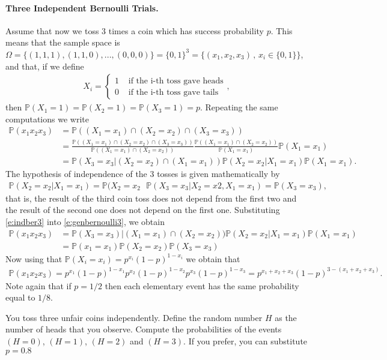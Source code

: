 \documentclass[12pt]{article}
\newcommand{\<}{{\langle \!\! \langle}}
\renewcommand{\>}{{\rangle \!\! \rangle}}
\newcommand{\bel}[2]{\begin{equation} \label{#1} \begin{split} #2
 					\end{split} \end{equation}}
\begin{document}
\paragraph{Three Independent Bernoulli Trials.} Assume that now we toss 3 times a coin which has success probability $p$. This means that the sample space is $\Omega=\{(1,1,1),(1,1,0),...,(0,0,0)\}=\{0,1\}^3=\{(x_1,x_2,x_3)\,,\,x_i\in\{0,1\}\}$, and that, if we define
\bel{}{X_i=\begin{cases}
1 & \textrm{ if the i-th toss gave heads}\\
0 & \textrm{ if the i-th toss gave tails}
\end{cases},}
then $\mathbb{P}(X_1 = 1) = \mathbb{P}(X_2 = 1) = \mathbb{P}( X_3 = 1) = p$. Repeating the same computations we write
\bel{e:genbernoulli3}{\mathbb{P}(x_1x_2x_3) & =\mathbb{P}((X_1=x_1)\cap (X_2=x_2) \cap (X_3=x_3)) \\
& = \frac{\mathbb{P}((X_1=x_1)\cap (X_2=x_2) \cap (X_3=x_3))}{\mathbb{P}((X_1=x_1)\cap (X_2=x_2))}\frac{\mathbb{P}((X_1=x_1)\cap (X_2=x_2))}{\mathbb{P}(X_1=x_1)}\mathbb{P}(X_1=x_1) \\ & =\mathbb{P}(X_3=x_3|(X_2=x_2)\cap (X_1=x_1))\mathbb{P}(X_2=x_2|X_1=x_1)\mathbb{P}(X_1=x_1).}
The hypothesis of independence of the 3 tosses is given mathematically by 
\bel{e:indber3}{\mathbb{P}(X_2=x_2|X_1=x_1)=\mathbb{P}(X_2=x_2 \,\,\,\,\mathbb{P}(X_3=x_3|X_2=x2,X_1=x_1)=\mathbb{P}(X_3=x_3),} that is, the result of the third coin toss does not depend from the first two and the result of the second one does not depend on the first one. Substituting \eqref{e:indber3} into \eqref{e:genbernoulli3}, we obtain
\bel{}{\mathbb{P}(x_1x_2x_3) & = \mathbb{P}(X_3 = x_3)| (X_1 = x_1)\cap (X_2 =x_2) ) \mathbb{P}(X_2 = x_2| X_1 = x_1)\mathbb{P}(X_1 = x_1) \\
 & =\mathbb{P}(x_1 = x_1)\mathbb{P}(X_2 = x_2)\mathbb{P}(X_3 =x_3)}
 Now using that $\mathbb{P}(X_i = x_i) = p^{x_i}(1-p)^{1-x_i}$ we obtain that
 \bel{}{\mathbb{P}(x_1x_2x_3)= p^{x_1}(1-p)^{1-x_1} p^{x_2}(1-p)^{1-x_2} p^{x_3}(1-p)^{1-x_3} = p^{x_1+x_2+x_3}(1-p)^{3-(x_1 + x_2 + x_3)}.}
 Note again that if $p=1/2$ then each elementary event has the same probability equal to $1/8$. 

 

 
 \begin{ExerciseList}

	 \Exercise You toss three unfair coins independently. Define the random number $H$ as the number of heads that you observe. Compute the probabilities of the events $( H = 0)$, $(H = 1)$, $(H =2) $ and $(H = 3)$. If you prefer, you can substitute $p = 0.8$   
 


 \end{ExerciseList}
\end{document}
